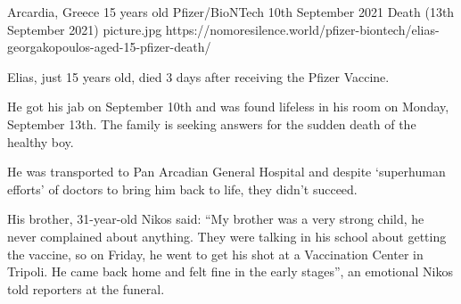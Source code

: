 {Arcardia, Greece}
{15 years old}
{Pfizer/BioNTech}
{10th September 2021}
{Death (13th September 2021)}
{picture.jpg}
{https://nomoresilence.world/pfizer-biontech/elias-georgakopoulos-aged-15-pfizer-death/}
{

Elias, just 15 years old, died 3 days after receiving the Pfizer Vaccine.

He got his jab on September 10th and was found lifeless in his room on Monday,
September 13th. The family is seeking answers for the sudden death of the
healthy boy.

He was transported to Pan Arcadian General Hospital and despite ‘superhuman
efforts’ of doctors to bring him back to life, they didn’t succeed.

His brother, 31-year-old Nikos said: “My brother was a very strong child, he
never complained about anything. They were talking in his school about getting
the vaccine, so on Friday, he went to get his shot at a Vaccination Center in
Tripoli. He came back home and felt fine in the early stages”, an emotional
Nikos told reporters at the funeral.

}
